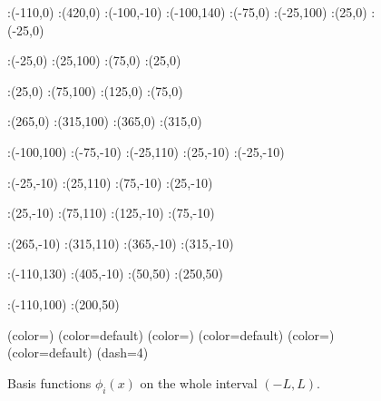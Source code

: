 \begin{figure}[h]
\figinit{0.8pt}
:(-110,0) :(420,0)
:(-100,-10) :(-100,140)
:(-75,0) :(-25,100) 
:(25,0) :(-25,0)

:(-25,0) :(25,100) 
:(75,0) :(25,0)

:(25,0) :(75,100) 
:(125,0) :(75,0)

:(265,0) :(315,100) 
:(365,0) :(315,0)

:(-100,100)
%
:(-75,-10) :(-25,110) 
:(25,-10) :(-25,-10)

:(-25,-10) :(25,110) 
:(75,-10) :(25,-10)

:(25,-10) :(75,110) 
:(125,-10) :(75,-10)

:(265,-10) :(315,110) 
:(365,-10) :(315,-10)

:(-110,130) :(405,-10)
:(50,50) :(250,50)

:(-110,100) :(200,50)

\figdrawbegin{}
\figdrawarrow[1,2]
\figdrawline[3,4]
\figdrawline[4,5]
\figset (color=\Redrgb)
\figdrawline[31,41]
\figdrawline[41,51]
\figset (color=default)
\figset (color=\ForestGreenrgb)
\figdrawline[32,42]
\figdrawline[42,52]
\figset (color=default)
\figset (color=\Bluergb)
\figdrawline[33,43]
\figdrawline[43,53]
\figset (color=default)
\figset(dash=4)
\figdrawline[4,6]
\figdrawline[200,4]
\figdrawline[41,61]
\figdrawline[42,62]
\figdrawline[43,63]
\figdrawarrow[11,12]

\figdrawend

\centerline{\box\figBoxA}
\caption{Basis functions $\phi_i(x)$ on the whole interval $(-L,L)$.}\label{basis_int}
\end{figure}

